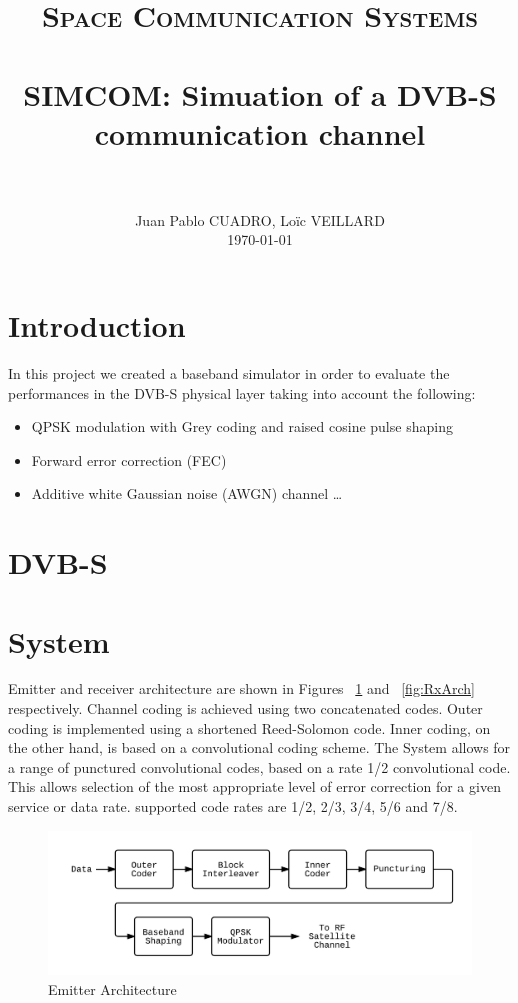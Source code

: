 \documentclass[paper=a4, fontsize=11pt]{scrartcl}	%
\title{
		\usefont{OT1}{bch}{b}{n}
		\normalfont \normalsize \textsc{Space Communication Systems} \\ [25pt]
		\horrule{0.5pt} \\[0.4cm]
		\huge SIMCOM: Simuation of a DVB-S communication channel \\
		\horrule{2pt} \\[0.5cm]
}
\author{
		\normalfont 								\normalsize
        Juan Pablo CUADRO, Lo\"{i}c VEILLARD\\[-3pt]	\normalsize
        \today
}
\date{}
\numberwithin{equation}{section}		%
\numberwithin{figure}{section}			%
\numberwithin{table}{section}			%
\begin{document}
\maketitle

\section{Introduction}
In this project we created a baseband simulator in order to evaluate the performances in the DVB-S physical layer taking into account the following:

\begin{itemize}

  \item QPSK modulation with Grey coding and raised cosine pulse shaping
  \item Forward error correction (FEC)
  \item Additive white Gaussian noise (AWGN) channel \ldots

\end{itemize}

\section{DVB-S}



\section{System}

Emitter and receiver architecture are shown in Figures ~\ref{fig:TxArch} and ~\ref{fig:RxArch} respectively. Channel coding is achieved using two concatenated codes. Outer coding is implemented using a shortened Reed-Solomon code. Inner coding, on the other hand, is based on a convolutional coding scheme. The System allows for a range of punctured convolutional codes, based on a rate 1/2 convolutional code. This allows selection of the most appropriate level of error correction for a given service or data rate. supported code rates are 1/2, 2/3, 3/4, 5/6 and 7/8.

\begin{figure}[htb]
\centering
\includegraphics[scale=0.25]{EmitterL.png}
\caption{Emitter Architecture}\label{fig:TxArch}
\end{figure}
\end{document}
